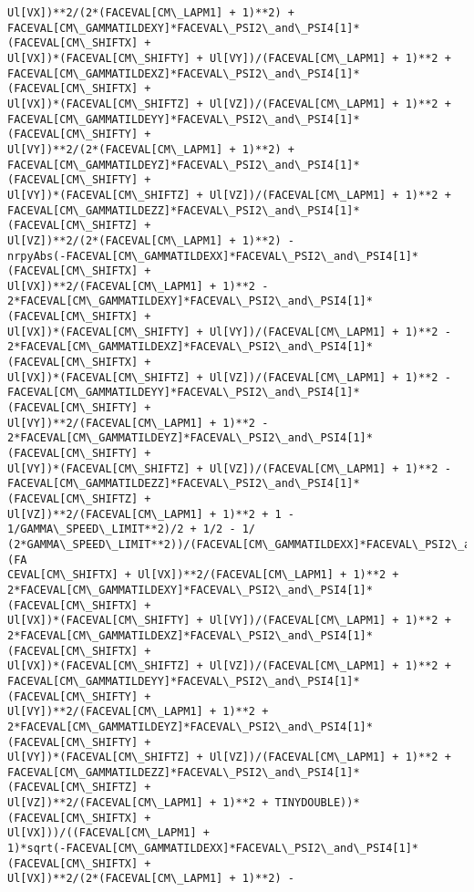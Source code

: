 \documentclass[landscape,letterpaper,10pt,english]{article}
\begin{document}
\begin{Verbatim}[commandchars=\\\{\}]
Ul[VX])**2/(2*(FACEVAL[CM\_LAPM1] + 1)**2) +
FACEVAL[CM\_GAMMATILDEXY]*FACEVAL\_PSI2\_and\_PSI4[1]*(FACEVAL[CM\_SHIFTX] +
Ul[VX])*(FACEVAL[CM\_SHIFTY] + Ul[VY])/(FACEVAL[CM\_LAPM1] + 1)**2 +
FACEVAL[CM\_GAMMATILDEXZ]*FACEVAL\_PSI2\_and\_PSI4[1]*(FACEVAL[CM\_SHIFTX] +
Ul[VX])*(FACEVAL[CM\_SHIFTZ] + Ul[VZ])/(FACEVAL[CM\_LAPM1] + 1)**2 +
FACEVAL[CM\_GAMMATILDEYY]*FACEVAL\_PSI2\_and\_PSI4[1]*(FACEVAL[CM\_SHIFTY] +
Ul[VY])**2/(2*(FACEVAL[CM\_LAPM1] + 1)**2) +
FACEVAL[CM\_GAMMATILDEYZ]*FACEVAL\_PSI2\_and\_PSI4[1]*(FACEVAL[CM\_SHIFTY] +
Ul[VY])*(FACEVAL[CM\_SHIFTZ] + Ul[VZ])/(FACEVAL[CM\_LAPM1] + 1)**2 +
FACEVAL[CM\_GAMMATILDEZZ]*FACEVAL\_PSI2\_and\_PSI4[1]*(FACEVAL[CM\_SHIFTZ] +
Ul[VZ])**2/(2*(FACEVAL[CM\_LAPM1] + 1)**2) -
nrpyAbs(-FACEVAL[CM\_GAMMATILDEXX]*FACEVAL\_PSI2\_and\_PSI4[1]*(FACEVAL[CM\_SHIFTX] +
Ul[VX])**2/(FACEVAL[CM\_LAPM1] + 1)**2 -
2*FACEVAL[CM\_GAMMATILDEXY]*FACEVAL\_PSI2\_and\_PSI4[1]*(FACEVAL[CM\_SHIFTX] +
Ul[VX])*(FACEVAL[CM\_SHIFTY] + Ul[VY])/(FACEVAL[CM\_LAPM1] + 1)**2 -
2*FACEVAL[CM\_GAMMATILDEXZ]*FACEVAL\_PSI2\_and\_PSI4[1]*(FACEVAL[CM\_SHIFTX] +
Ul[VX])*(FACEVAL[CM\_SHIFTZ] + Ul[VZ])/(FACEVAL[CM\_LAPM1] + 1)**2 -
FACEVAL[CM\_GAMMATILDEYY]*FACEVAL\_PSI2\_and\_PSI4[1]*(FACEVAL[CM\_SHIFTY] +
Ul[VY])**2/(FACEVAL[CM\_LAPM1] + 1)**2 -
2*FACEVAL[CM\_GAMMATILDEYZ]*FACEVAL\_PSI2\_and\_PSI4[1]*(FACEVAL[CM\_SHIFTY] +
Ul[VY])*(FACEVAL[CM\_SHIFTZ] + Ul[VZ])/(FACEVAL[CM\_LAPM1] + 1)**2 -
FACEVAL[CM\_GAMMATILDEZZ]*FACEVAL\_PSI2\_and\_PSI4[1]*(FACEVAL[CM\_SHIFTZ] +
Ul[VZ])**2/(FACEVAL[CM\_LAPM1] + 1)**2 + 1 - 1/GAMMA\_SPEED\_LIMIT**2)/2 + 1/2 - 1/
(2*GAMMA\_SPEED\_LIMIT**2))/(FACEVAL[CM\_GAMMATILDEXX]*FACEVAL\_PSI2\_and\_PSI4[1]*(FA
CEVAL[CM\_SHIFTX] + Ul[VX])**2/(FACEVAL[CM\_LAPM1] + 1)**2 +
2*FACEVAL[CM\_GAMMATILDEXY]*FACEVAL\_PSI2\_and\_PSI4[1]*(FACEVAL[CM\_SHIFTX] +
Ul[VX])*(FACEVAL[CM\_SHIFTY] + Ul[VY])/(FACEVAL[CM\_LAPM1] + 1)**2 +
2*FACEVAL[CM\_GAMMATILDEXZ]*FACEVAL\_PSI2\_and\_PSI4[1]*(FACEVAL[CM\_SHIFTX] +
Ul[VX])*(FACEVAL[CM\_SHIFTZ] + Ul[VZ])/(FACEVAL[CM\_LAPM1] + 1)**2 +
FACEVAL[CM\_GAMMATILDEYY]*FACEVAL\_PSI2\_and\_PSI4[1]*(FACEVAL[CM\_SHIFTY] +
Ul[VY])**2/(FACEVAL[CM\_LAPM1] + 1)**2 +
2*FACEVAL[CM\_GAMMATILDEYZ]*FACEVAL\_PSI2\_and\_PSI4[1]*(FACEVAL[CM\_SHIFTY] +
Ul[VY])*(FACEVAL[CM\_SHIFTZ] + Ul[VZ])/(FACEVAL[CM\_LAPM1] + 1)**2 +
FACEVAL[CM\_GAMMATILDEZZ]*FACEVAL\_PSI2\_and\_PSI4[1]*(FACEVAL[CM\_SHIFTZ] +
Ul[VZ])**2/(FACEVAL[CM\_LAPM1] + 1)**2 + TINYDOUBLE))*(FACEVAL[CM\_SHIFTX] +
Ul[VX]))/((FACEVAL[CM\_LAPM1] +
1)*sqrt(-FACEVAL[CM\_GAMMATILDEXX]*FACEVAL\_PSI2\_and\_PSI4[1]*(FACEVAL[CM\_SHIFTX] +
Ul[VX])**2/(2*(FACEVAL[CM\_LAPM1] + 1)**2) -

\end{Verbatim}
\end{document}
